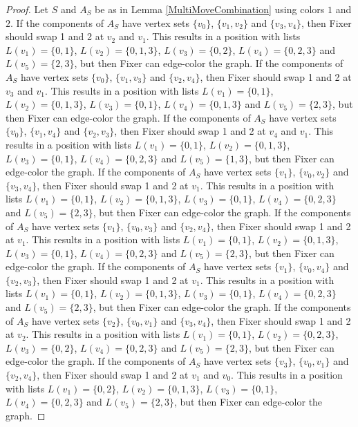 \documentclass[12pt]{amsart}
\theoremstyle{plain}
\theoremstyle{definition}
\theoremstyle{remark}
\begin{document}
\begin{proof}
Let $S$ and $A_S$ be as in Lemma \ref{MultiMoveCombination} using colors $1$ and $2$. If the components of $A_S$ have vertex sets $\{v_0\}$, $\{v_1, v_2\}$ and $\{v_3, v_4\}$, then Fixer should swap 1 and 2 at $v_2$ and $v_1$. This results in a position with lists $L(v_1) = \{0, 1\}$, $L(v_2) = \{0, 1, 3\}$, $L(v_3) = \{0, 2\}$, $L(v_4) = \{0, 2, 3\}$ and $L(v_5) = \{2, 3\}$, but then Fixer can edge-color the graph.
If the components of $A_S$ have vertex sets $\{v_0\}$, $\{v_1, v_3\}$ and $\{v_2, v_4\}$, then Fixer should swap 1 and 2 at $v_3$ and $v_1$. This results in a position with lists $L(v_1) = \{0, 1\}$, $L(v_2) = \{0, 1, 3\}$, $L(v_3) = \{0, 1\}$, $L(v_4) = \{0, 1, 3\}$ and $L(v_5) = \{2, 3\}$, but then Fixer can edge-color the graph.
If the components of $A_S$ have vertex sets $\{v_0\}$, $\{v_1, v_4\}$ and $\{v_2, v_3\}$, then Fixer should swap 1 and 2 at $v_4$ and $v_1$. This results in a position with lists $L(v_1) = \{0, 1\}$, $L(v_2) = \{0, 1, 3\}$, $L(v_3) = \{0, 1\}$, $L(v_4) = \{0, 2, 3\}$ and $L(v_5) = \{1, 3\}$, but then Fixer can edge-color the graph.
If the components of $A_S$ have vertex sets $\{v_1\}$, $\{v_0, v_2\}$ and $\{v_3, v_4\}$, then Fixer should swap 1 and 2 at $v_1$. This results in a position with lists $L(v_1) = \{0, 1\}$, $L(v_2) = \{0, 1, 3\}$, $L(v_3) = \{0, 1\}$, $L(v_4) = \{0, 2, 3\}$ and $L(v_5) = \{2, 3\}$, but then Fixer can edge-color the graph.
If the components of $A_S$ have vertex sets $\{v_1\}$, $\{v_0, v_3\}$ and $\{v_2, v_4\}$, then Fixer should swap 1 and 2 at $v_1$. This results in a position with lists $L(v_1) = \{0, 1\}$, $L(v_2) = \{0, 1, 3\}$, $L(v_3) = \{0, 1\}$, $L(v_4) = \{0, 2, 3\}$ and $L(v_5) = \{2, 3\}$, but then Fixer can edge-color the graph.
If the components of $A_S$ have vertex sets $\{v_1\}$, $\{v_0, v_4\}$ and $\{v_2, v_3\}$, then Fixer should swap 1 and 2 at $v_1$. This results in a position with lists $L(v_1) = \{0, 1\}$, $L(v_2) = \{0, 1, 3\}$, $L(v_3) = \{0, 1\}$, $L(v_4) = \{0, 2, 3\}$ and $L(v_5) = \{2, 3\}$, but then Fixer can edge-color the graph.
If the components of $A_S$ have vertex sets $\{v_2\}$, $\{v_0, v_1\}$ and $\{v_3, v_4\}$, then Fixer should swap 1 and 2 at $v_2$. This results in a position with lists $L(v_1) = \{0, 1\}$, $L(v_2) = \{0, 2, 3\}$, $L(v_3) = \{0, 2\}$, $L(v_4) = \{0, 2, 3\}$ and $L(v_5) = \{2, 3\}$, but then Fixer can edge-color the graph.
If the components of $A_S$ have vertex sets $\{v_3\}$, $\{v_0, v_1\}$ and $\{v_2, v_4\}$, then Fixer should swap 1 and 2 at $v_1$ and $v_0$. This results in a position with lists $L(v_1) = \{0, 2\}$, $L(v_2) = \{0, 1, 3\}$, $L(v_3) = \{0, 1\}$, $L(v_4) = \{0, 2, 3\}$ and $L(v_5) = \{2, 3\}$, but then Fixer can edge-color the graph.

\end{proof}
\end{document}
